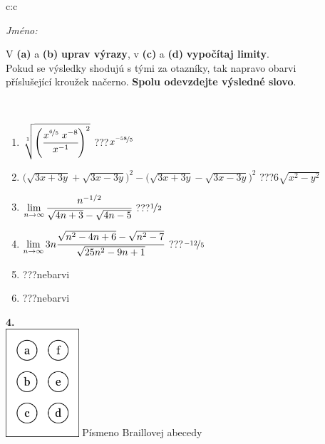 \documentclass[10pt]{report}
\begin{document}
\begin{tabular}{c:c}
\begin{minipage}[c][104.5mm][t]{0.5\linewidth}
\begin{center}
\textit{Jméno:}\phantom{xxxxxxxxxxxxxxxxxxxxxxxxxxxxxxxxxxxxxxxxxxxxxxxxxxxxxxxxxxxxxxxxx}\\[5mm]
\begin{minipage}{0.95\linewidth}
\begin{center}
V \textbf{(a)} a \textbf{(b)} \textbf{uprav výrazy}, v \textbf{(c)} a \textbf{(d)} \textbf{vypočítaj limity}.\\Pokud se výsledky shodujú s tými za otazníky, tak napravo obarvi\\příslušející kroužek načerno. \textbf{Spolu odevzdejte výsledné slovo}.
\end{center}
\end{minipage}
\\[1mm]
\begin{minipage}{0.79\linewidth}
\begin{center}
\begin{varwidth}{\linewidth}
\begin{enumerate}
\small
\item $\sqrt[1]{\left(\cfrac{x^{\nicefrac{6}{5}}\;x^{-8}}{x^{-1}}\right)^{2}}$\quad \dotfill\; ???\;\dotfill \quad $x^{\nicefrac{-58}{5}}$
\item {\footnotesize{\scriptsize$\big(\sqrt{3x+3y}+\sqrt{3x-3y}\big)^2-\big(\sqrt{3x+3y}-\sqrt{3x-3y}\big)^2$}\quad \dotfill\; ???\;\dotfill \quad $6\sqrt{x^2-y^2}$}
\item $\lim\limits_{n\to\infty}\cfrac{n^{-1/2}}{\sqrt{4n+3}-\sqrt{4n-5}}$\quad \dotfill\; ???\;\dotfill \quad $\nicefrac{1}{2}$
\item $\lim\limits_{n\to\infty}3n\cfrac{\sqrt{n^2-4n+6}-\sqrt{n^2-7}}{\sqrt{25n^2-9n+1}}$\quad \dotfill\; ???\;\dotfill \quad $\nicefrac{-12}{5}$
\item \quad \dotfill\; ???\;\dotfill \quad nebarvi
\item \quad \dotfill\; ???\;\dotfill \quad nebarvi
\end{enumerate}
\end{varwidth}
\end{center}
\end{minipage}
\begin{minipage}{0.20\linewidth}
\begin{center}
{\Huge\bfseries 4.} \\[2mm]
\includegraphics[height=40mm]{../images/braille.png}
{\small Písmeno Braillovej abecedy}
\end{center}
\end{minipage}
\end{center}
\end{minipage}
%
\end{tabular}
\end{document}
